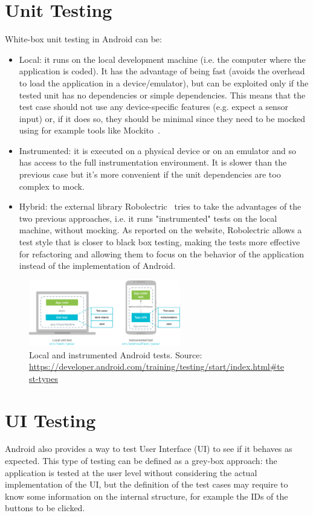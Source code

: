 \documentclass[11pt,a4paper,notitlepage]{article}
\begin{document}
\section{Unit Testing}
White-box unit testing in Android can be:
\begin{itemize}
	\item Local: it runs on the local development machine (i.e. the computer where the application is coded). It has the advantage of being fast (avoids the overhead to load the application in a device/emulator), but can be exploited only if the tested unit has no dependencies or simple dependencies. This means that the test case should not use any device-specific features (e.g. expect a sensor input) or, if it does so, they should be minimal since they need to be mocked using for example tools like Mockito~\cite{Mockito}.
	\item Instrumented: it is executed on a physical device or on an emulator and so has access to the full instrumentation environment. It is slower than the previous case but it's more convenient if the unit dependencies are too complex to mock.
	\item Hybrid: the external library Robolectric~\cite{Robolectric} tries to take the advantages of the two previous approaches, i.e. it runs "instrumented" tests on the local machine, without mocking. As reported on the website, Robolectric allows a test style that is closer to black box testing, making the tests more effective for refactoring and allowing them to focus on the behavior of the application instead of the implementation of Android.
\end{itemize}
\begin{figure}
  \centering
  \includegraphics[width=250px]{Images/Android/test-types.png}
  \caption[Local and Instrumented Android Tests]{Local and instrumented Android tests. Source: \url{https://developer.android.com/training/testing/start/index.html\#test-types}}
\end{figure}

\section{UI Testing}
Android also provides a way to test User Interface (UI) to see if it behaves as expected. This type of testing can be defined as a grey-box approach: the application is tested at the user level without considering the actual implementation of the UI, but the definition of the test cases may require to know some information on the internal structure, for example the IDs of the buttons to be clicked.
\end{document}
